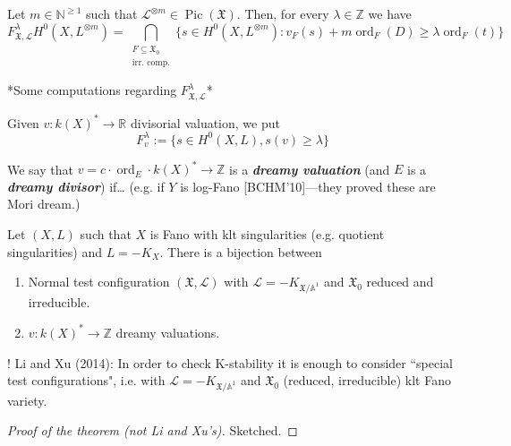 \begin{prop}\leavevmode
Let \(m \in \mathbb{N}^{\geq 1}\) such that \(\mathcal{L}^{\otimes m} \in \operatorname{Pic}(\mathfrak{X})\). Then, for every \(\lambda \in \mathbb{Z}\) we have
\[F^\lambda_{\mathfrak{X},\mathcal{L}}H^{0}(X,L^{\otimes m})=\bigcap_{\substack{F \subseteq \mathfrak{X}_0 \\ \text{irr. comp.} }}\{s \in H^{0}(X,L^{\otimes m}):v_F(s)+m \operatorname{ord}_F(D) \geq \lambda \operatorname{ord}_F(t)\}\]
\end{prop}

*Some computations regarding \(F^\lambda_{\mathfrak{X},\mathcal{L}}\)*

\begin{defn}\leavevmode
Given \(v: k(X)^* \longrightarrow\mathbb{R}\) divisorial valuation, we put
\[F^\lambda_v:=\{s \in H^{0}(X,L),s(v) \geq \lambda\}\]
\end{defn}

\begin{defn}[K. Fujta '16]\leavevmode
	We say that \(v=c\cdot \operatorname{ord}_E\cdot k(X)^* \longrightarrow \mathbb{Z}\) is a \textit{\textbf{dreamy valuation}} (and \(E\) is a \textit{\textbf{dreamy divisor}}) if… (e.g. if \(Y\) is log-Fano [BCHM'10]---they proved these are Mori dream.)
\end{defn}

\begin{thm}\leavevmode
Let \((X,L)\) such that \(X\) is Fano with klt singularities (e.g. quotient singularities) and \(L=-K_X\). There is a bijection between
\begin{enumerate}
\item Normal test configuration \((\mathfrak{X},\mathcal{L})\) with \(\mathcal{L}=-K_{\mathfrak{X}/\mathbb{A}^1}\) and \(\mathfrak{X}_0\) reduced and irreducible.
\item \(v:k(X)^* \longrightarrow \mathbb{Z}\) dreamy valuations.
\end{enumerate}
\end{thm}

\begin{thing7}{!}\leavevmode
Li and Xu (2014): In order to check K-stability it is enough to consider  ``special test configurations", i.e. with \(\mathcal{L}=-K_{\mathfrak{X}/\mathbb{A}^1}\) and \(\mathfrak{X}_0\) (reduced, irreducible) klt Fano variety.
\end{thing7}

\begin{proof}[Proof of the theorem (not Li and Xu's)]\leavevmode
Sketched.
\end{proof}

